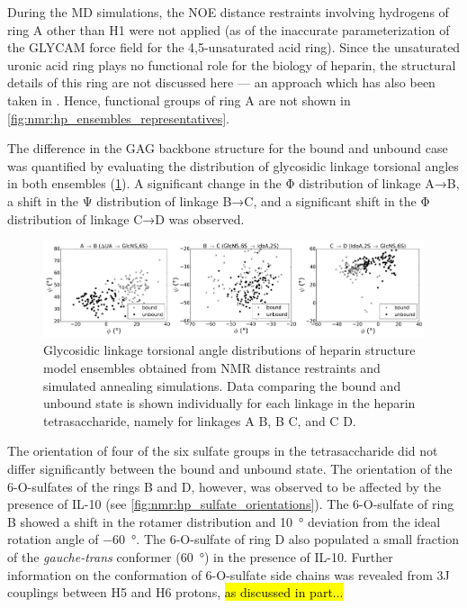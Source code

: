 During the MD simulations, the NOE distance restraints involving hydrogens of
ring A other than H1 were not applied (as of the inaccurate parameterization of
the GLYCAM force field for the 4,5-unsaturated acid ring). Since the unsaturated
uronic acid ring plays no functional role for the biology of heparin, the
structural details of this ring are not discussed here --- an approach which has
also been taken in
\cite{jin_heparin_2009}. Hence, functional groups of ring A are not shown in
\cref{fig:nmr:hp_ensembles_representatives}.

The difference in the GAG backbone structure for the bound and unbound case was
quantified by evaluating the distribution of glycosidic linkage torsional angles
in both ensembles (\cref{fig:nmr:hp_glyco_dihedral_distributions}). A
significant change in the Φ distribution of linkage A→B, a shift in the Ψ
distribution of linkage B→C, and a significant shift in the Φ distribution of
linkage C→D was observed.

\begin{figure}
\begin{adjustwidth}{-2cm}{-2cm}
\centering
\includegraphics[width=1.3\textwidth]{gfx/nmr/Figure_08_glycolinkage_dihedrals_bound_vs_free_three_3panels_05.png}
\caption[]{
Glycosidic linkage torsional angle distributions of heparin structure model
ensembles obtained from NMR distance restraints and simulated annealing
simulations. Data comparing the bound and unbound state is shown individually
for each linkage in the heparin tetrasaccharide, namely for linkages A
\rightarrow B, B \rightarrow C, and C \rightarrow D.
}
\label{fig:nmr:hp_glyco_dihedral_distributions}
\end{adjustwidth}
\end{figure}

The orientation of four of the six sulfate groups in the tetrasaccharide did not
differ significantly between the bound and unbound state. The orientation of the
6-O-sulfates of the rings B and D, however, was observed to be affected by the
presence of IL-10 (see \cref{fig:nmr:hp_sulfate_orientations}). The 6-O-sulfate
of ring B showed a shift in the rotamer distribution and \SI{10}{\degree}
deviation from the ideal rotation angle of \SI{-60}{\degree}. The 6-O-sulfate of
ring D also populated a small fraction of the \textit{gauche-trans} conformer
(\SI{60}{\degree}) in the presence of IL-10. Further information on the
conformation of 6-O-sulfate side chains was revealed from 3J couplings between
H5 and H6 protons, \hl{as discussed in part...}

